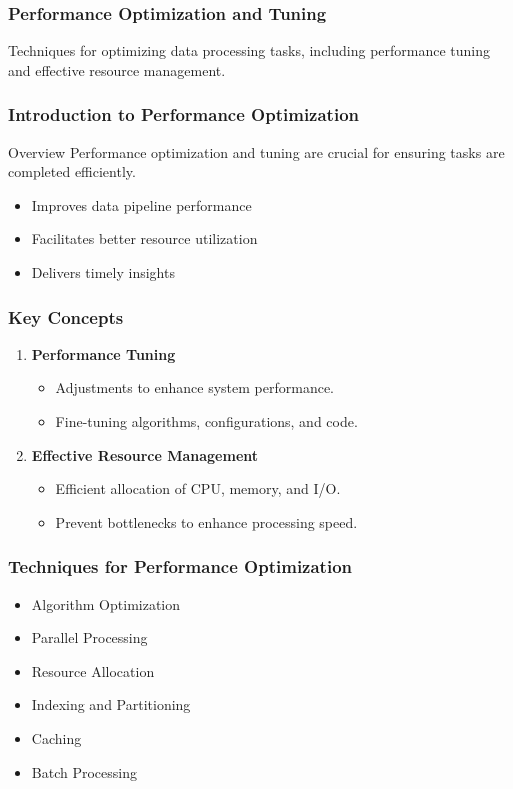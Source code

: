 \documentclass{beamer}
\begin{document}
\begin{frame}[fragile]
    \frametitle{Performance Optimization and Tuning}
    Techniques for optimizing data processing tasks, including performance tuning and effective resource management.
\end{frame}

\begin{frame}[fragile]
    \frametitle{Introduction to Performance Optimization}
    \begin{block}{Overview}
        Performance optimization and tuning are crucial for ensuring tasks are completed efficiently.
    \end{block}
    \begin{itemize}
        \item Improves data pipeline performance
        \item Facilitates better resource utilization
        \item Delivers timely insights
    \end{itemize}
\end{frame}

\begin{frame}[fragile]
    \frametitle{Key Concepts}
    \begin{enumerate}
        \item \textbf{Performance Tuning}
            \begin{itemize}
                \item Adjustments to enhance system performance.
                \item Fine-tuning algorithms, configurations, and code.
            \end{itemize}
        \item \textbf{Effective Resource Management}
            \begin{itemize}
                \item Efficient allocation of CPU, memory, and I/O.
                \item Prevent bottlenecks to enhance processing speed.
            \end{itemize}
    \end{enumerate}
\end{frame}

\begin{frame}[fragile]
    \frametitle{Techniques for Performance Optimization}
    \begin{itemize}
        \item Algorithm Optimization
        \item Parallel Processing
        \item Resource Allocation
        \item Indexing and Partitioning
        \item Caching
        \item Batch Processing
    \end{itemize}
\end{frame}
\end{document}
